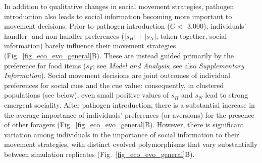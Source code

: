 In addition to qualitative changes in social movement strategies, pathogen introduction also leads to social information becoming more important to movement decisions.
Prior to pathogen introduction ($G <$ 3,000), individuals' handler- and non-handler preferences ($|s_H| + |s_N|$; taken together, social information) barely influence their movement strategies (Fig.~\ref{fig_eco_evo_general}B).
These are instead guided primarily by the preference for food items ($s_F$; see \textit{Model and Analysis}; see also \textit{Supplementary Information}).
Social movement decisions are joint outcomes of individual preferences for social cues and the cue value: consequently, in clustered populations (see below), even small positive values of $s_H$ and $s_N$ lead to strong emergent sociality.
After pathogen introduction, there is a substantial increase in the average importance of individuals' preferences (or aversions) for the presence of other foragers (Fig.~\ref{fig_eco_evo_general}B).
However, there is significant variation among individuals in the importance of social information to their movement strategies, with distinct evolved polymorphisms that vary substantially between simulation replicates (Fig.~\ref{fig_eco_evo_general}B).

